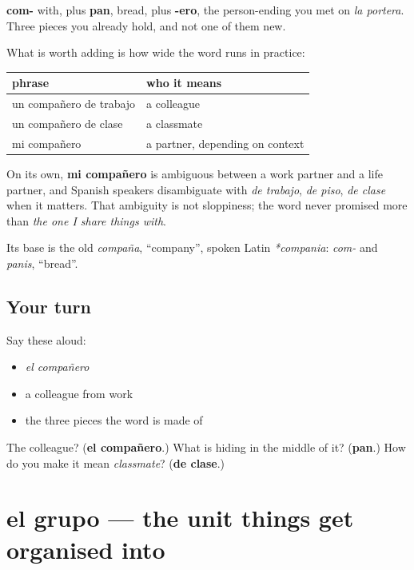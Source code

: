\begin{cousinweb}
\textbf{com-} with, plus \textbf{pan}, bread, plus \textbf{-ero}, the person-ending you met on \emph{la portera}. Three pieces you already hold, and not one of them new.

What is worth adding is how wide the word runs in practice:

\noindent
\begin{tabularx}{\linewidth}{@{}>{\raggedright\arraybackslash}X>{\raggedright\arraybackslash}X@{}}
\toprule
\textbf{phrase} & \textbf{who it means} \\
\midrule
un compañero de trabajo & a colleague \\
un compañero de clase & a classmate \\
mi compañero & a partner, depending on context \\
\bottomrule
\end{tabularx}

On its own, \textbf{mi compañero} is ambiguous between a work partner and a life partner, and Spanish speakers disambiguate with \emph{de trabajo}, \emph{de piso}, \emph{de clase} when it matters. That ambiguity is not sloppiness; the word never promised more than \emph{the one I share things with}.

Its base is the old \emph{compaña}, \textquotedblleft{}company\textquotedblright{}, spoken Latin \emph{*compania}: \emph{com-} and \emph{panis}, \textquotedblleft{}bread\textquotedblright{}.
\end{cousinweb}

\subsection*{Your turn}
Say these aloud:

\begin{itemize}
\raggedright
  \item \emph{el compañero}
  \item a colleague from work
  \item the three pieces the word is made of
\end{itemize}

\begin{tcolorbox}[breakable,colback=teal!4,colframe=teal!35!black,title={Before you move on}]
The colleague? (\textbf{el compañero}.) What is hiding in the middle of it? (\textbf{pan}.) How do you make it mean \emph{classmate}? (\textbf{de clase}.)
\end{tcolorbox}
\section[el grupo]{el grupo — the unit things get organised into}

